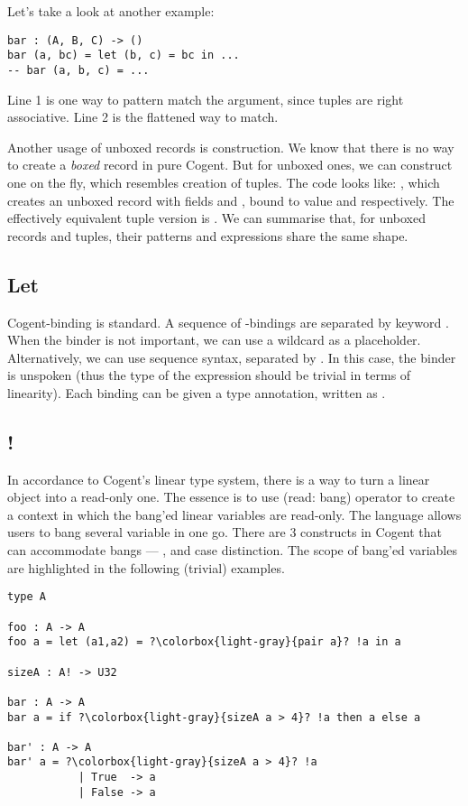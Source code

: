 \documentclass[a4paper]{article}
\newcommand{\cogent}{Cogent\xspace}
\begin{document}
Let's take a look at another example:
\begin{lstlisting}[language=Cogent]
bar : (A, B, C) -> ()
bar (a, bc) = let (b, c) = bc in ...
-- bar (a, b, c) = ...
\end{lstlisting}
Line 1 is one way to pattern match the argument, since tuples are right associative.
Line 2 is the flattened way to match.

Another usage of unboxed records is construction. We know that there is
no way to create a \emph{boxed} record in pure \cogent. But for unboxed ones,
we can construct one on the fly, which resembles creation of tuples. The code looks like:
, which creates an unboxed record with fields 
and , bound to value  and  respectively.
The effectively equivalent tuple version is .
We can summarise that, for unboxed records and tuples, their patterns and expressions
share the same shape.

\subsection{Let} \label{ssec:letbang}
\cogent {}-binding is standard. A sequence of -bindings are separated
by keyword . When the binder is not important, we can use a wildcard \code{\_}
as a placeholder. Alternatively, we can use sequence syntax, separated by \code{;}. In this
case, the binder is unspoken (thus the type of the expression should be trivial in terms of
linearity). Each binding can be given a type annotation, written as .

\subsection{!}
In accordance to \cogent's linear type system, there is a way to turn a linear
object into a read-only one. The essence is to use \code{!} (read: bang) operator to create a
context in which the bang'ed linear variables are read-only. The language allows users to
bang several variable in one go. There are 3 constructs in \cogent that can accommodate bangs ---
,  and case distinction. The scope of bang'ed variables are highlighted in the following
(trivial) examples.
\begin{lstlisting}[language=Cogent,escapechar=?]
type A

foo : A -> A
foo a = let (a1,a2) = ?\colorbox{light-gray}{pair a}? !a in a

sizeA : A! -> U32

bar : A -> A
bar a = if ?\colorbox{light-gray}{sizeA a > 4}? !a then a else a

bar' : A -> A
bar' a = ?\colorbox{light-gray}{sizeA a > 4}? !a
           | True  -> a
           | False -> a
\end{lstlisting}
\end{document}
